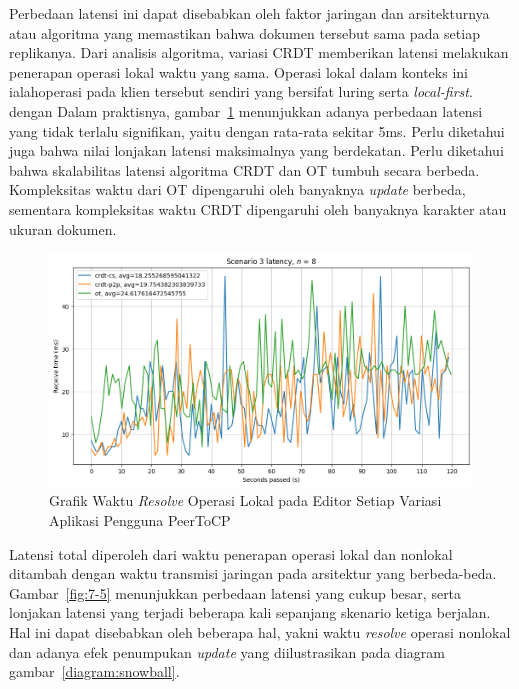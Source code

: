 Perbedaan latensi ini dapat disebabkan oleh faktor jaringan dan arsitekturnya atau algoritma yang memastikan bahwa dokumen tersebut sama pada setiap replikanya. Dari analisis algoritma, variasi CRDT memberikan latensi melakukan penerapan operasi lokal waktu yang sama. Operasi lokal dalam konteks ini ialahoperasi pada klien tersebut sendiri yang bersifat luring serta \textit{local-first}. dengan  Dalam praktisnya, gambar~\ref{fig:12-5} menunjukkan adanya perbedaan latensi yang tidak terlalu signifikan, yaitu dengan rata-rata sekitar 5ms. Perlu diketahui juga bahwa nilai lonjakan latensi maksimalnya yang berdekatan. Perlu diketahui bahwa skalabilitas latensi algoritma CRDT dan OT tumbuh secara berbeda. Kompleksitas waktu dari OT dipengaruhi oleh banyaknya \textit{update} berbeda, sementara kompleksitas waktu CRDT dipengaruhi oleh banyaknya karakter atau ukuran dokumen.

\begin{figure}
 \centering
 \includegraphics[width=15cm]{./assets/skripsi/benchmark-vis_cell_12_output_5}
 \caption{Grafik Waktu \textit{Resolve} Operasi Lokal pada Editor Setiap Variasi Aplikasi Pengguna PeerToCP}
 \label{fig:12-5}
\end{figure}

Latensi total diperoleh dari waktu penerapan operasi lokal dan nonlokal ditambah dengan waktu transmisi jaringan pada arsitektur yang berbeda-beda. Gambar~\ref{fig:7-5} menunjukkan perbedaan latensi yang cukup besar, serta lonjakan latensi yang terjadi beberapa kali sepanjang skenario ketiga berjalan. Hal ini dapat disebabkan oleh beberapa hal, yakni waktu \textit{resolve} operasi nonlokal dan adanya efek penumpukan \textit{update} yang diilustrasikan pada diagram gambar~\ref{diagram:snowball}.


